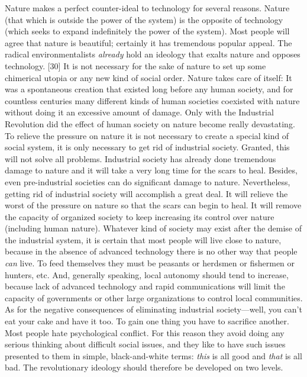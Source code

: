  Nature makes a perfect counter-ideal to technology for several reasons. Nature (that which is outside the power of the system) is the opposite of technology (which seeks to expand indefinitely the power of the system). Most people will agree that nature is beautiful; certainly it has tremendous popular appeal. The radical environmentalists {\em already} hold an ideology that exalts nature and opposes technology. [30] It is not necessary for the sake of nature to set up some chimerical utopia or any new kind of social order. Nature takes care of itself: It was a spontaneous creation that existed long before any human society, and for countless centuries many different kinds of human societies coexisted with nature without doing it an excessive amount of damage. Only with the Industrial Revolution did the effect of human society on nature become really devastating. To relieve the pressure on nature it is not necessary to create a special kind of social system, it is only necessary to get rid of industrial society. Granted, this will not solve all problems. Industrial society has already done tremendous damage to nature and it will take a very long time for the scars to heal. Besides, even pre-industrial societies can do significant damage to nature. Nevertheless, getting rid of industrial society will accomplish a great deal. It will relieve the worst of the pressure on nature so that the scars can begin to heal. It will remove the capacity of organized society to keep increasing its control over nature (including human nature). Whatever kind of society may exist after the demise of the industrial system, it is certain that most people will live close to nature, because in the absence of advanced technology there is no other way that people {\em can} live. To feed themselves they must be peasants or herdsmen or fishermen or hunters, etc. And, generally speaking, local autonomy should tend to increase, because lack of advanced technology and rapid communications will limit the capacity of governments or other large organizations to control local communities.
 As for the negative consequences of eliminating industrial society—well, you can’t eat your cake and have it too. To gain one thing you have to sacrifice another.
 Most people hate psychological conflict. For this reason they avoid doing any serious thinking about difficult social issues, and they like to have such issues presented to them in simple, black-and-white terms: {\em this} is all good and {\em that} is all bad. The revolutionary ideology should therefore be developed on two levels.
